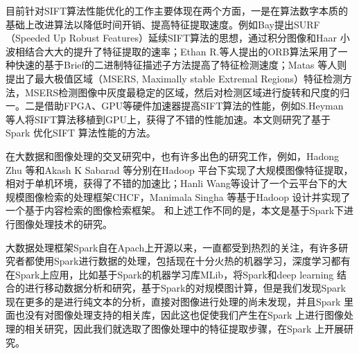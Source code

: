 目前针对SIFT算法性能优化的工作主要体现在两个方面，一是在算法数字本质的基础上改进算法以降低时间开销、提高特征提取速度。例如Bay提出SURF（Speeded Up Robust Features）延续SIFT算法的思想，通过积分图像和Haar 小波相结合大大的提升了特征提取的速率；Ethan R.等人提出的ORB算法采用了一种快速的基于Brief的二进制特征描述子方法提高了特征检测速度；Matas 等人则提出了最大极值区域（MSERS, Maximally stable Extremal Regions）特征检测方法，MSERS检测图像中灰度最稳定的区域，然后对检测区域进行旋转和尺度的归一。二是借助FPGA、GPU等硬件加速器提高SIFT算法的性能，例如S.Heyman 等人将SIFT算法移植到GPU上，获得了不错的性能加速。本文则研究了基于Spark 优化SIFT 算法性能的方法。

在大数据和图像处理的交叉研究中，也有许多出色的研究工作，例如，Hadong Zhu 等和Akash K Sabarad 等分别在Hadoop 平台下实现了大规模图像特征提取，相对于单机环境，获得了不错的加速比；Hanli Wang等设计了一个云平台下的大规模图像检索的处理框架CHCF，Manimala Singha 等基于Hadoop 设计并实现了一个基于内容检索的图像检索框架。 和上述工作不同的是，本文是基于Spark下进行图像处理技术的研究。

大数据处理框架Spark自在Apach上开源以来，一直都受到热烈的关注，有许多研究者都使用Spark进行数据的处理，包括现在十分火热的机器学习，深度学习都有在Spark上应用，比如基于Spark的机器学习库MLib，将Spark和deep learning 结合的进行移动数据分析和研究，基于Spark的对规模图计算，但是我们发现Spark现在更多的是进行纯文本的分析，直接对图像进行处理的尚未发现，并且Spark 里面也没有对图像处理支持的相关库，因此这也促使我们产生在Spark 上进行图像处理的相关研究，因此我们就选取了图像处理中的特征提取步骤，在Spark 上开展研究。

